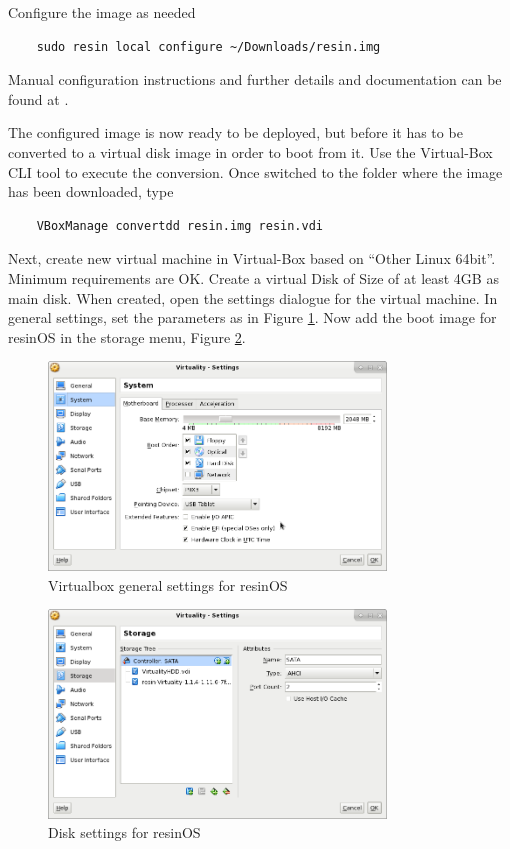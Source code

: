 \documentclass[]{scrartcl}
\begin{document}
Configure the image as needed
\begin{verbatim}
	sudo resin local configure ~/Downloads/resin.img
\end{verbatim}

Manual configuration instructions and further details and documentation can be found at \cite{resin02}.

The configured image is now ready to be deployed, but before it has to be converted to a virtual disk image in order to boot from it. Use the Virtual-Box CLI tool to execute the conversion. Once switched to the folder where the image has been downloaded, type
\begin{verbatim}
	VBoxManage convertdd resin.img resin.vdi
\end{verbatim}

Next, create new virtual machine in Virtual-Box based on ``Other Linux 64bit''. Minimum requirements are OK. Create a virtual Disk of Size of at least 4GB as main disk. 
When created, open the settings dialogue for the virtual machine. In general settings, set the parameters as in Figure \ref{fig:resingen}. Now add the boot image for resinOS in the storage menu, Figure \ref{fig:resindisk}.

\begin{figure}[t]
	\centering
	\includegraphics[width=0.8\textwidth]{resin-vbox}
	\caption{Virtualbox general settings for resinOS}
	\label{fig:resingen}
\end{figure}

\begin{figure}[t]
	\centering
	\includegraphics[width=0.8\textwidth]{resin-vbox2}
	\caption{Disk settings for resinOS}
	\label{fig:resindisk}
\end{figure}
\end{document}
